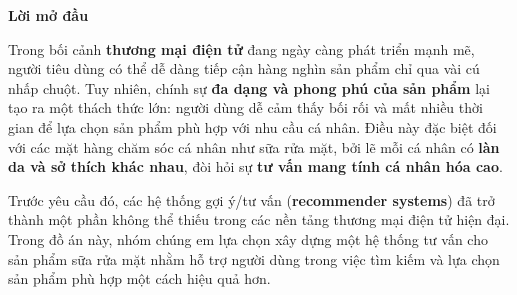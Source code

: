 \newpage

\begin{center}
    {\LARGE \textbf{Lời mở đầu}}
\end{center}


\vspace{2cm}
Trong bối cảnh \textbf{thương mại điện tử} đang ngày càng phát triển mạnh mẽ, người tiêu dùng có thể dễ dàng tiếp cận hàng nghìn sản phẩm chỉ qua vài cú nhấp chuột. Tuy nhiên, chính sự \textbf{đa dạng và phong phú của sản phẩm} lại tạo ra một thách thức lớn: người dùng dễ cảm thấy bối rối và mất nhiều thời gian để lựa chọn sản phẩm phù hợp với nhu cầu cá nhân. Điều này đặc biệt đối với các mặt hàng chăm sóc cá nhân như sữa rửa mặt, bởi lẽ mỗi cá nhân có \textbf{làn da và sở thích khác nhau}, đòi hỏi sự \textbf{tư vấn mang tính cá nhân hóa cao}.

\vspace{0.5cm}

Trước yêu cầu đó, các hệ thống gợi ý/tư vấn (\textbf{recommender systems}) đã trở thành một phần không thể thiếu trong các nền tảng thương mại điện tử hiện đại. Trong đồ án này, nhóm chúng em lựa chọn xây dựng một hệ thống tư vấn cho sản phẩm sữa rửa mặt nhằm hỗ trợ người dùng trong việc tìm kiếm và lựa chọn sản phẩm phù hợp một cách hiệu quả hơn. 